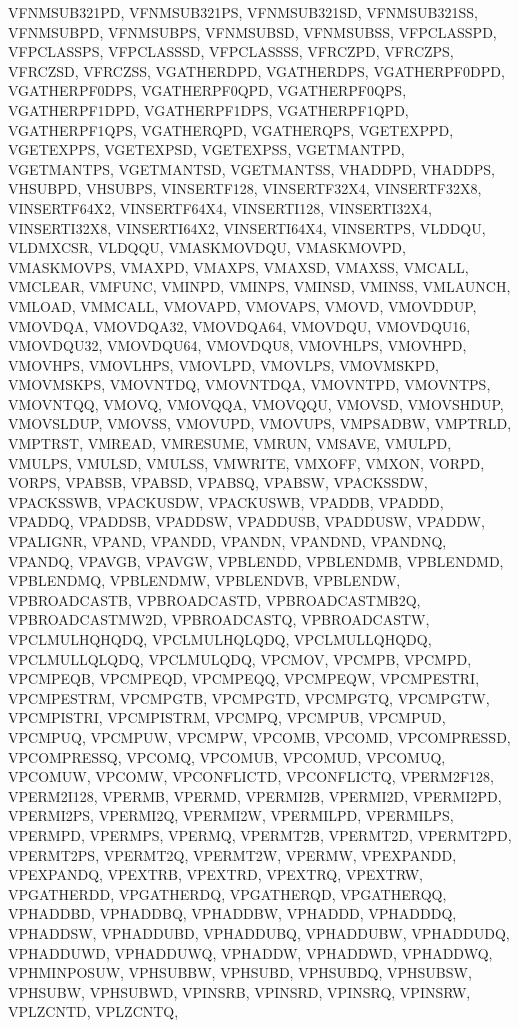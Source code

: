 {{VFNMSUB321PD, VFNMSUB321PS, VFNMSUB321SD, VFNMSUB321SS, VFNMSUBPD, VFNMSUBPS,
VFNMSUBSD, VFNMSUBSS, VFPCLASSPD, VFPCLASSPS, VFPCLASSSD, VFPCLASSSS, VFRCZPD,
VFRCZPS, VFRCZSD, VFRCZSS, VGATHERDPD, VGATHERDPS, VGATHERPF0DPD, VGATHERPF0DPS,
VGATHERPF0QPD, VGATHERPF0QPS, VGATHERPF1DPD, VGATHERPF1DPS, VGATHERPF1QPD,
VGATHERPF1QPS, VGATHERQPD, VGATHERQPS, VGETEXPPD, VGETEXPPS, VGETEXPSD,
VGETEXPSS, VGETMANTPD, VGETMANTPS, VGETMANTSD, VGETMANTSS, VHADDPD, VHADDPS,
VHSUBPD, VHSUBPS, VINSERTF128, VINSERTF32X4, VINSERTF32X8, VINSERTF64X2,
VINSERTF64X4, VINSERTI128, VINSERTI32X4, VINSERTI32X8, VINSERTI64X2,
VINSERTI64X4, VINSERTPS, VLDDQU, VLDMXCSR, VLDQQU, VMASKMOVDQU, VMASKMOVPD,
VMASKMOVPS, VMAXPD, VMAXPS, VMAXSD, VMAXSS, VMCALL, VMCLEAR, VMFUNC, VMINPD,
VMINPS, VMINSD, VMINSS, VMLAUNCH, VMLOAD, VMMCALL, VMOVAPD, VMOVAPS, VMOVD,
VMOVDDUP, VMOVDQA, VMOVDQA32, VMOVDQA64, VMOVDQU, VMOVDQU16, VMOVDQU32,
VMOVDQU64, VMOVDQU8, VMOVHLPS, VMOVHPD, VMOVHPS, VMOVLHPS, VMOVLPD, VMOVLPS,
VMOVMSKPD, VMOVMSKPS, VMOVNTDQ, VMOVNTDQA, VMOVNTPD, VMOVNTPS, VMOVNTQQ, VMOVQ,
VMOVQQA, VMOVQQU, VMOVSD, VMOVSHDUP, VMOVSLDUP, VMOVSS, VMOVUPD, VMOVUPS,
VMPSADBW, VMPTRLD, VMPTRST, VMREAD, VMRESUME, VMRUN, VMSAVE, VMULPD, VMULPS,
VMULSD, VMULSS, VMWRITE, VMXOFF, VMXON, VORPD, VORPS, VPABSB, VPABSD, VPABSQ,
VPABSW, VPACKSSDW, VPACKSSWB, VPACKUSDW, VPACKUSWB, VPADDB, VPADDD, VPADDQ,
VPADDSB, VPADDSW, VPADDUSB, VPADDUSW, VPADDW, VPALIGNR, VPAND, VPANDD, VPANDN,
VPANDND, VPANDNQ, VPANDQ, VPAVGB, VPAVGW, VPBLENDD, VPBLENDMB, VPBLENDMD,
VPBLENDMQ, VPBLENDMW, VPBLENDVB, VPBLENDW, VPBROADCASTB, VPBROADCASTD,
VPBROADCASTMB2Q, VPBROADCASTMW2D, VPBROADCASTQ, VPBROADCASTW, VPCLMULHQHQDQ,
VPCLMULHQLQDQ, VPCLMULLQHQDQ, VPCLMULLQLQDQ, VPCLMULQDQ, VPCMOV, VPCMPB, VPCMPD,
VPCMPEQB, VPCMPEQD, VPCMPEQQ, VPCMPEQW, VPCMPESTRI, VPCMPESTRM, VPCMPGTB,
VPCMPGTD, VPCMPGTQ, VPCMPGTW, VPCMPISTRI, VPCMPISTRM, VPCMPQ, VPCMPUB, VPCMPUD,
VPCMPUQ, VPCMPUW, VPCMPW, VPCOMB, VPCOMD, VPCOMPRESSD, VPCOMPRESSQ, VPCOMQ,
VPCOMUB, VPCOMUD, VPCOMUQ, VPCOMUW, VPCOMW, VPCONFLICTD, VPCONFLICTQ,
VPERM2F128, VPERM2I128, VPERMB, VPERMD, VPERMI2B, VPERMI2D, VPERMI2PD,
VPERMI2PS, VPERMI2Q, VPERMI2W, VPERMILPD, VPERMILPS, VPERMPD, VPERMPS, VPERMQ,
VPERMT2B, VPERMT2D, VPERMT2PD, VPERMT2PS, VPERMT2Q, VPERMT2W, VPERMW, VPEXPANDD,
VPEXPANDQ, VPEXTRB, VPEXTRD, VPEXTRQ, VPEXTRW, VPGATHERDD, VPGATHERDQ,
VPGATHERQD, VPGATHERQQ, VPHADDBD, VPHADDBQ, VPHADDBW, VPHADDD, VPHADDDQ,
VPHADDSW, VPHADDUBD, VPHADDUBQ, VPHADDUBW, VPHADDUDQ, VPHADDUWD, VPHADDUWQ,
VPHADDW, VPHADDWD, VPHADDWQ, VPHMINPOSUW, VPHSUBBW, VPHSUBD, VPHSUBDQ, VPHSUBSW,
VPHSUBW, VPHSUBWD, VPINSRB, VPINSRD, VPINSRQ, VPINSRW, VPLZCNTD, VPLZCNTQ,
}}
